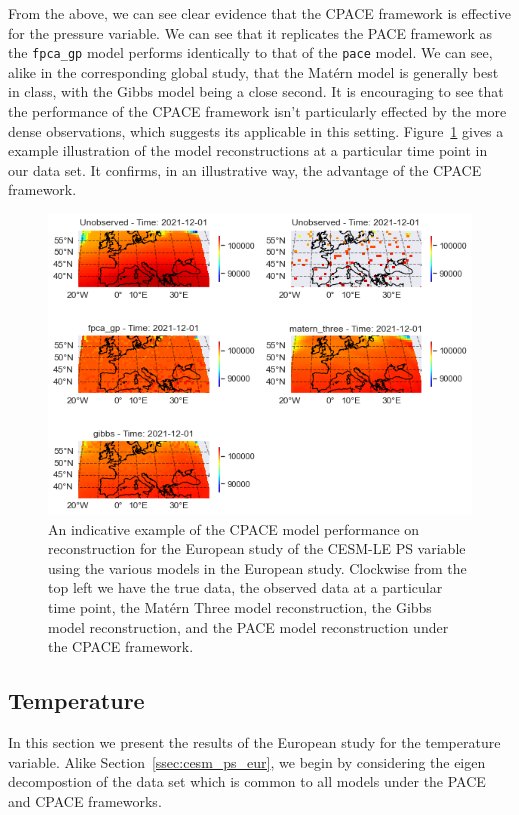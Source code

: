 From the above, we can see clear evidence that the CPACE framework is effective for the pressure variable.
We can see that it replicates the PACE framework as the \verb*|fpca_gp| model performs identically to that of the \verb*|pace| model.
We can see, alike in the corresponding global study, that the Mat\'ern model is generally best in class, with the Gibbs model being a close second.
It is encouraging to see that the performance of the CPACE framework isn't particularly effected by the more dense observations, which suggests its applicable in this setting. 
Figure~\ref{fig:full_ex_ps_eur} gives a example illustration of the model reconstructions at a particular time point in our data set.
It confirms,  in an illustrative way, the advantage of the CPACE framework.

\begin{figure}
	\centering
	\includegraphics[width=\textwidth]{full_ex_ps_eur}
	\caption{An indicative example of the CPACE model performance on reconstruction for the European study of the CESM-LE PS variable using the various models in the European study. Clockwise from the top left we have the true data, the observed data at a particular time point, the Mat\'ern Three model reconstruction, the Gibbs model reconstruction, and the PACE model reconstruction under the CPACE framework.}
	\label{fig:full_ex_ps_eur}
\end{figure}

\subsection{Temperature \label{ssec:cesm_trefht_eur}}
In this section we present the results of the European study for the temperature variable. 
Alike Section~\ref{ssec:cesm_ps_eur}, we begin by considering the eigen decompostion of the data set which is common to all models under the PACE and CPACE frameworks. 

